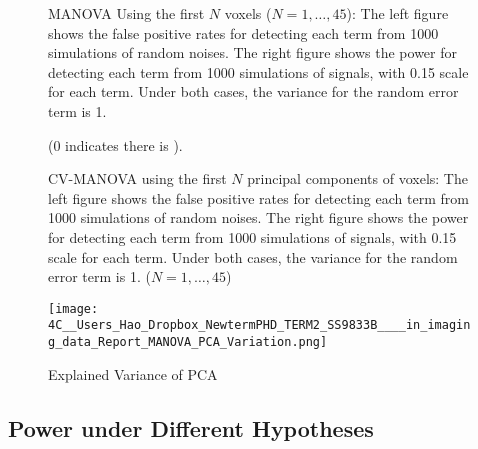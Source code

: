 \begin{figure}[H]
\begin{centering}
\par\end{centering}

\centering{}\protect\caption{{\footnotesize{}MANOVA Using the first $N$ voxels ($N=1,\ldots,45$):
The left figure shows the false positive rates for detecting each
term from 1000 simulations of random noises. The right figure shows
the power for detecting each term from 1000 simulations of signals,
with 0.15 scale for each term. Under both cases, the variance for
the random error term is 1.}\label{fig:MANOVA1} }
\end{figure}


\begin{figure}[H]
\centering{}(0 indicates there is ).\protect\caption{{\footnotesize{}CV-MANOVA using the first $N$ principal components
of voxels: The left figure shows the false positive rates for detecting
each term from 1000 simulations of random noises. The right figure
shows the power for detecting each term from 1000 simulations of signals,
with 0.15 scale for each term. Under both cases, the variance for
the random error term is 1. ($N=1,\ldots,45$) }{\small{}\label{fig:CV-MANOVA-PCA}}}
\end{figure}


\begin{figure}[H]
\centering{}\texttt{[image: 4C\_\_Users\_Hao\_Dropbox\_NewtermPHD\_TERM2\_SS9833B\_\_\_\_in\_imaging\_data\_Report\_MANOVA\_PCA\_Variation.png]}\protect\caption{Explained Variance of PCA\label{fig:Explained-Variance-of}}
\end{figure}



\subsection{Power under Different Hypotheses}

